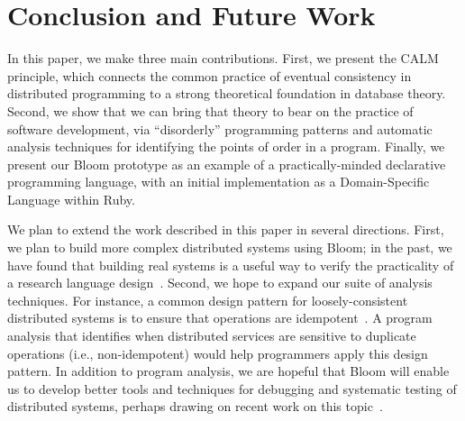\section{Conclusion and Future Work}
\label{sec:conclusion}
In this paper, we make three main contributions.  First, we present the CALM
principle, which connects the common practice of eventual consistency in
distributed programming to a strong theoretical foundation in database theory.
Second, we show that we can bring that theory to bear on the practice of
software development, via ``disorderly'' programming patterns and automatic
analysis techniques for identifying the points of order in a program. Finally,
we present our Bloom prototype as an example of a practically-minded declarative
programming language, with an initial implementation as a Domain-Specific
Language within Ruby.

We plan to extend the work described in this paper in several directions. First,
we plan to build more complex distributed systems using Bloom; in the past, we
have found that building real systems is a useful way to verify the practicality
of a research language design~\cite{boom-eurosys}.  Second, we hope to expand
our suite of analysis techniques. For instance, a common design pattern for
loosely-consistent distributed systems is to ensure that operations are
idempotent~\cite{beyond,quicksand}. A program analysis that identifies when
distributed services are sensitive to duplicate operations (i.e.,
non-idempotent) would help programmers apply this design pattern. In addition to
program analysis, we are hopeful that Bloom will enable us to develop better
tools and techniques for debugging and systematic testing of distributed
systems, perhaps drawing on recent work on this topic~\cite{fate-destini}.

